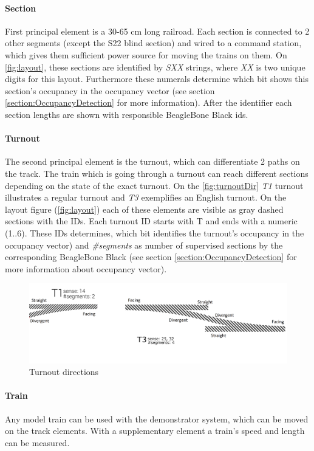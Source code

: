 \paragraph{Section} 
First principal element is a 30-65 cm long railroad. Each section is connected to 2 other segments (except the S22 blind section) and wired to a command station, which gives them sufficient power source for moving the trains on them. On \autoref{fig:layout}, these sections are identified by \textit{SXX} strings, where \textit{XX} is two unique digits for this layout. Furthermore these numerals determine which bit shows this section's occupancy in the occupancy vector (see section \ref{section:OccupancyDetection} for more information). After the identifier each section lengths are shown with responsible BeagleBone Black ids.

\paragraph{Turnout}
The second principal element is the turnout, which can differentiate 2 paths on the track. The train which is going through a turnout can reach different sections depending on the state of the exact turnout. On the \autoref{fig:turnoutDir} \textit{T1} turnout illustrates a regular turnout and \textit{T3} exemplifies an English turnout. On the layout figure (\ref{fig:layout}) each of these elements are visible as gray dashed sections with the IDs. Each turnout ID starts with T and ends with a numeric (1..6). These IDs determines, which bit identifies the turnout's occupancy in the occupancy vector) and \textit{\#segments} as number of supervised sections by the corresponding BeagleBone Black (see section \ref{section:OccupancyDetection} for more information about occupancy vector). 

\begin{figure}[ht]
	\centering
	\includegraphics[width=150mm]{figures/modes3/t1andt3.png}
	\caption{Turnout directions}
	\label{fig:turnoutDir}
\end{figure}

\paragraph{Train}
Any model train can be used with the demonstrator system, which can be moved on the track elements. With a supplementary element a train's speed and length can be measured.


